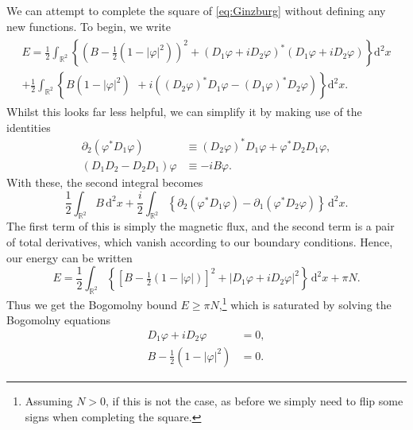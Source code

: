 \documentclass[11pt, fleqn]{article}
\begin{document}
We can attempt to complete the square of \eqref{eq:Ginzburg} without defining any new functions. To begin, we write
	\begin{align}
		\begin{split}
			E = \frac{1}{2} \int_{\mathbb{R}^2} \left\{ \left( B - \tfrac{1}{2} (1 - |\varphi|^2) \right)^2 + \left( D_1 \varphi + i D_2 \varphi \right)^* \left( D_1 \varphi + i D_2 \varphi \right) \right\} \mathrm{d}^2x\\
			+ \frac{1}{2} \int_{\mathbb{R}^2} \left\{ B(1 - |\varphi|^2)^{\phantom 2 } +i \left( \left( D_2 \varphi \right)^* D_1 \varphi - \left(D_1 \varphi\right)^* D_2 \varphi \right)  \right\} \mathrm{d}^2x.
		\end{split}
	\end{align}
Whilst this looks far less helpful, we can simplify it by making use of the identities
	\begin{subequations}\begin{align}
		\partial_2 \left( \varphi^* D_1 \varphi \right) &\equiv \left( D_2 \varphi \right)^* D_1 \varphi + \varphi^* D_2 D_1 \varphi, \\
		(D_1 D_2 - D_2 D_1) \varphi &\equiv -iB\varphi.
	\end{align}\end{subequations}
With these, the second integral becomes
	\begin{equation*}\label{key}
		\frac{1}{2} \int_{\mathbb{R}^2} B \, \mathrm{d}^2x + \frac{i}{2} \int_{\mathbb{R}^2} \left\{ \partial_2 \left( \varphi^* D_1 \varphi \right) - \partial_1 \left( \varphi^* D_2 \varphi \right) \right\} \, \mathrm{d}^2x .
	\end{equation*}
The first term of this is simply the magnetic flux, and the second term is a pair of total derivatives, which vanish according to our boundary conditions. Hence, our energy can be written
	\begin{equation}\label{key}
		E = \frac{1}{2} \int_{\mathbb{R}^2} \left\{ \left[ B - \tfrac{1}{2}(1-|\varphi|) \right] ^2 + \left| D_1 \varphi + i D_2 \varphi \right|^2 \right\} \, \mathrm{d}^2x + \pi N.
	\end{equation}
Thus we get the Bogomolny bound $ E \geq \pi N $,\footnote{Assuming $ N > 0 $, if this is not the case, as before we simply need to flip some signs when completing the square.} which is saturated by solving the Bogomolny equations
	\begin{subequations}\begin{align}
		D_1 \varphi + i D_2 \varphi &= 0, \label{eq:vortexBogo1} \\
		B - \tfrac{1}{2} (1-|\varphi|^2) &= 0. \label{eq:vortexBogo2}
	\end{align}\end{subequations}
\end{document}

